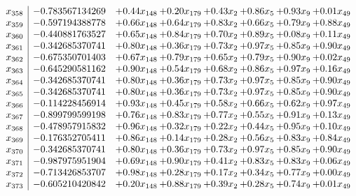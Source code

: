 \documentclass[8pt]{article}
\begin{document}
\[\begin{array}{c| c c@{\hskip 2pt} c@{\hskip 2pt} c@{\hskip 2pt} c@{\hskip 2pt} c@{\hskip 2pt} c@{\hskip 2pt} }
 x_{358}   &  -0.783567134269 & +  0.44 x_{148} & +  0.20 x_{179} & +  0.43 x_{2} & +  0.86 x_{5} & +  0.93 x_{9} & +  0.01 x_{49}\\
 x_{359}   &  -0.597194388778 & +  0.66 x_{148} & +  0.64 x_{179} & +  0.83 x_{2} & +  0.66 x_{5} & +  0.79 x_{9} & +  0.88 x_{49}\\
 x_{360}   &  -0.440881763527 & +  0.65 x_{148} & +  0.84 x_{179} & +  0.70 x_{2} & +  0.89 x_{5} & +  0.08 x_{9} & +  0.11 x_{49}\\
 x_{361}   &  -0.342685370741 & +  0.80 x_{148} & +  0.36 x_{179} & +  0.73 x_{2} & +  0.97 x_{5} & +  0.85 x_{9} & +  0.90 x_{49}\\
 x_{362}   &  -0.675350701403 & +  0.67 x_{148} & +  0.79 x_{179} & +  0.65 x_{2} & +  0.79 x_{5} & +  0.90 x_{9} & +  0.02 x_{49}\\
 x_{363}   &  -0.645290581162 & +  0.90 x_{148} & +  0.54 x_{179} & +  0.68 x_{2} & +  0.86 x_{5} & +  0.97 x_{9} & +  0.16 x_{49}\\
 x_{364}   &  -0.342685370741 & +  0.80 x_{148} & +  0.36 x_{179} & +  0.73 x_{2} & +  0.97 x_{5} & +  0.85 x_{9} & +  0.90 x_{49}\\
 x_{365}   &  -0.342685370741 & +  0.80 x_{148} & +  0.36 x_{179} & +  0.73 x_{2} & +  0.97 x_{5} & +  0.85 x_{9} & +  0.90 x_{49}\\
 x_{366}   &  -0.114228456914 & +  0.93 x_{148} & +  0.45 x_{179} & +  0.58 x_{2} & +  0.66 x_{5} & +  0.62 x_{9} & +  0.97 x_{49}\\
 x_{367}   &  -0.899799599198 & +  0.76 x_{148} & +  0.83 x_{179} & +  0.77 x_{2} & +  0.55 x_{5} & +  0.91 x_{9} & +  0.13 x_{49}\\
 x_{368}   &  -0.478957915832 & +  0.96 x_{148} & +  0.32 x_{179} & +  0.22 x_{2} & +  0.44 x_{5} & +  0.95 x_{9} & +  0.10 x_{49}\\
 x_{369}   &  -0.176352705411 & +  0.86 x_{148} & +  0.14 x_{179} & +  0.28 x_{2} & +  0.56 x_{5} & +  0.83 x_{9} & +  0.84 x_{49}\\
 x_{370}   &  -0.342685370741 & +  0.80 x_{148} & +  0.36 x_{179} & +  0.73 x_{2} & +  0.97 x_{5} & +  0.85 x_{9} & +  0.90 x_{49}\\
 x_{371}   &  -0.987975951904 & +  0.69 x_{148} & +  0.90 x_{179} & +  0.41 x_{2} & +  0.83 x_{5} & +  0.83 x_{9} & +  0.06 x_{49}\\
 x_{372}   &  -0.713426853707 & +  0.98 x_{148} & +  0.28 x_{179} & +  0.17 x_{2} & +  0.34 x_{5} & +  0.77 x_{9} & +  0.00 x_{49}\\
 x_{373}   &  -0.605210420842 & +  0.20 x_{148} & +  0.88 x_{179} & +  0.39 x_{2} & +  0.28 x_{5} & +  0.74 x_{9} & +  0.01 x_{49}\\

\end{array}\]
\end{document}
